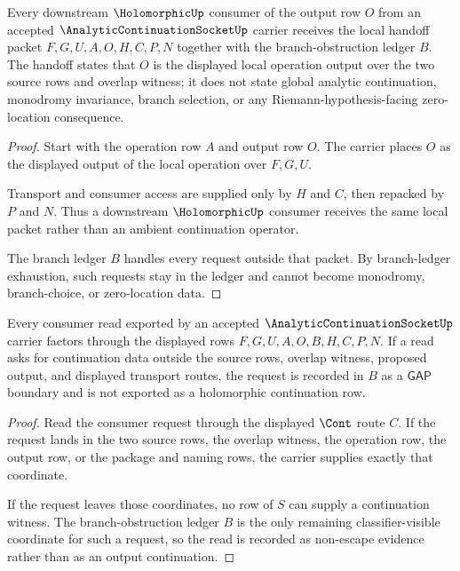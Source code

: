 \begin{theorem}
\label{thm:analytic-continuation-socket-local-output-handoff}
Every downstream $\HolomorphicUp$ consumer of the output row $O$ from an accepted $\AnalyticContinuationSocketUp$ carrier receives the local handoff packet $F,G,U,A,O,H,C,P,N$ together with the branch-obstruction ledger $B$. The handoff states that $O$ is the displayed local operation output over the two source rows and overlap witness; it does not state global analytic continuation, monodromy invariance, branch selection, or any Riemann-hypothesis-facing zero-location consequence.
\end{theorem}
\begin{proof}
Start with the operation row $A$ and output row $O$. The carrier places $O$ as the displayed output of the local operation over $F,G,U$.

Transport and consumer access are supplied only by $H$ and $C$, then repacked by $P$ and $N$. Thus a downstream $\HolomorphicUp$ consumer receives the same local packet rather than an ambient continuation operator.

The branch ledger $B$ handles every request outside that packet. By branch-ledger exhaustion, such requests stay in the ledger and cannot become monodromy, branch-choice, or zero-location data.
\end{proof}

\begin{theorem}
\label{thm:analytic-continuation-socket-ledger-nonescape}
Every consumer read exported by an accepted $\AnalyticContinuationSocketUp$ carrier factors through the displayed rows $F,G,U,A,O,B,H,C,P,N$. If a read asks for continuation data outside the source rows, overlap witness, proposed output, and displayed transport routes, the request is recorded in $B$ as a $\mathsf{GAP}$ boundary and is not exported as a holomorphic continuation row.
\end{theorem}
\begin{proof}
Read the consumer request through the displayed $\Cont$ route $C$. If the request lands in the two source rows, the overlap witness, the operation row, the output row, or the package and naming rows, the carrier supplies exactly that coordinate.

If the request leaves those coordinates, no row of $S$ can supply a continuation witness. The branch-obstruction ledger $B$ is the only remaining classifier-visible coordinate for such a request, so the read is recorded as non-escape evidence rather than as an output continuation.
\end{proof}

